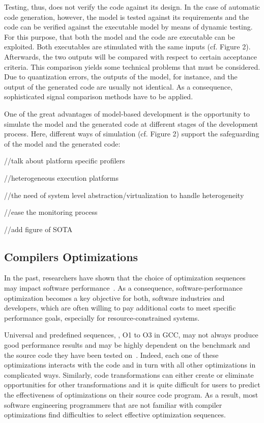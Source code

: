  
Testing, thus, does not verify the code against its design. In the
case of automatic code generation, however, the model is tested
against its requirements and the code can be verified against the
executable model by means of dynamic testing. For this purpose,
that both the model and the code are executable can be exploited.
Both executables are stimulated with the same inputs (cf. Figure
2). Afterwards, the two outputs will be compared with respect
to certain acceptance criteria. This comparison yields some technical
problems that must be considered. Due to quantization errors,
the outputs of the model, for instance, and the output of the
generated code are usually not identical. As a consequence, sophisticated
signal comparison methods have to be applied.



One of the great advantages of model-based development is
the opportunity to simulate the model and the generated code at
different stages of the development process. Here, different ways
of simulation (cf. Figure 2) support the safeguarding of the model
and the generated code:
\fi

//talk about platform specific profilers

//heterogeneous execution platforms

//the need of system level abstraction/virtualization to handle heterogeneity

//ease the monitoring process 

//add figure of SOTA 


\cleardoublepage
\iffalse 
\subsection{Compilers Optimizations}
In the past, researchers have shown that the choice of optimization sequences may impact software performance~\cite{almagor2004finding,chen2012deconstructing}. 
As a consequence, software-performance optimization becomes a key objective for both, software industries and developers, which are often willing to pay additional costs to meet specific performance goals, especially for resource-constrained systems.

Universal and predefined sequences, \eg, O1 to O3 in GCC, may not always produce good performance results and may be highly dependent on the benchmark and the source code they have been tested on~\cite{almagor2004finding,hoste2008cole}.
Indeed, each one of these optimizations interacts with the code and in turn with all other optimizations in complicated ways. Similarly, code transformations can either create or eliminate opportunities for other transformations and it is quite difficult for users to predict the effectiveness of optimizations on their source code program.
As a result, most software engineering programmers that are not familiar with compiler optimizations find difficulties to select effective optimization sequences.

